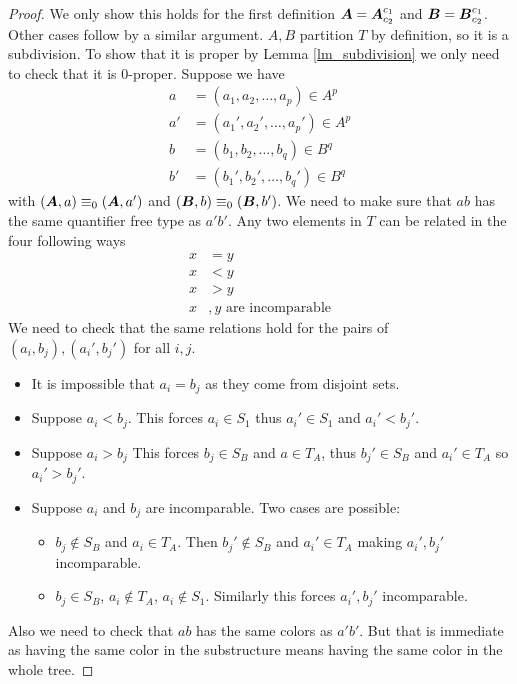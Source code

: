 \documentclass{amsart}
\DeclareMathOperator{\A}{\boldface A}
\DeclareMathOperator{\B}{\boldface B}
\begin{document}
\begin{proof}
	We only show this holds for the first definition $\A = \A^{c_1}_{c_2}$ and $\B = \B^{c_1}_{c_2}$. Other cases follow by a similar argument. $A,B$ partition $T$ by definition, so it is a subdivision. To show that it is proper by Lemma \ref{lm_subdivision} we only need to check that it is $0$-proper. Suppose we have 
	\begin{align*}
		a &= (a_1, a_2, \ldots, a_p) \in A^p \\
		a' &= (a_1', a_2', \ldots, a_p') \in A^p  \\
		b &= (b_1, b_2, \ldots, b_q) \in B^q  \\
		b' &= (b_1', b_2', \ldots, b_q') \in B^q 
	\end{align*}
	with $(\A, a) \equiv_0 (\A, a')$ and $(\B, b) \equiv_0 (\B, b')$. We need to make sure that $ab$ has the same quantifier free type as $a'b'$. Any two elements in $T$ can be related in the four following ways
	\begin{align*}
		x &= y \\
		x &< y \\
		x &> y \\
		x&,y \text{ are incomparable}
	\end{align*}
	We need to check that the same relations hold for the pairs of $(a_i, b_j), (a_i', b_j')$ for all $i,j$.
	
	\begin{itemize}
		\item It is impossible that $a_i = b_j$ as they come from disjoint sets.
		\item Suppose $a_i < b_j$. This forces $a_i \in S_1$ thus $a_i' \in S_1$ and $a_i' < b_j'$.
		\item Suppose $a_i > b_j$ This forces $b_j \in S_B$ and $a \in T_A$, thus $b_j' \in S_B$ and $a_i' \in T_A$ so $a_i' > b_j'$.
		\item Suppose $a_i$ and $b_j$ are incomparable. Two cases are possible:
		\begin{itemize}
			\item $b_j \notin S_B$ and $a_i \in T_A$. Then $b_j' \notin S_B$ and $a_i' \in T_A$ making $a_i', b_j'$ incomparable.
			\item $b_j \in S_B$, $a_i \notin T_A$, $a_i \notin S_1$. Similarly this forces $a_i', b_j'$ incomparable.
		\end{itemize}
	\end{itemize}
	Also we need to check that $ab$ has the same colors as $a'b'$. But that is immediate as having the same color in the substructure means having the same color in the whole tree.
\end{proof}
\end{document}
